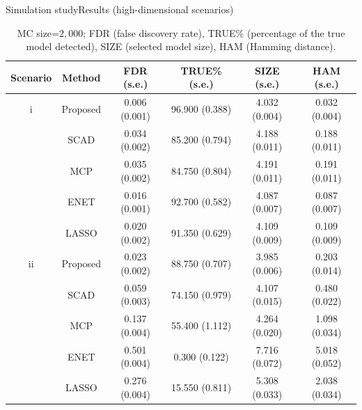 \documentclass[citecolor=blue,10pt]{beamer}
\newcommand{\0} {\mbox{\boldmath$0$}}
\begin{document}
\begin{frame}{Simulation study}{Results (high-dimensional scenarios)}
{\footnotesize
\begin{table}[H]
 \centering 
 \caption{MC size=$2,000$; FDR (false discovery rate), TRUE\% (percentage of the true model detected), SIZE (selected model size), HAM (Hamming distance).}\label{T:sim1}
 \begin{tabular}{cc|c|c|c|c}
  \hline
  Scenario & Method                         & FDR  (s.e.)    & TRUE\% (s.e.)   & SIZE (s.e.)     & HAM (s.e.)    \\
  \hline
i           & Proposed & 0.006 (0.001)  & 96.900 (0.388)  & 4.032 (0.004)    & 0.032 (0.004) \\
           & SCAD                           & 0.034 (0.002)  & 85.200 (0.794)  & 4.188 (0.011)   & 0.188 (0.011) \\
           & MCP                            & 0.035 (0.002)  & 84.750 (0.804)  & 4.191 (0.011)   & 0.191 (0.011) \\
           & ENET                           & 0.016 (0.001)  & 92.700 (0.582)  & 4.087 (0.007)   & 0.087 (0.007) \\
           & LASSO                          & 0.020 (0.002)  & 91.350 (0.629)  & 4.109 (0.009)   & 0.109 (0.009) \\
  \hline
ii           & Proposed & 0.023  (0.002) & 88.750  (0.707) & 3.985 (0.006)  & 0.203 (0.014) \\
           & SCAD                           & 0.059 (0.003)  & 74.150 (0.979)  & 4.107 (0.015)   & 0.480 (0.022) \\
           & MCP                            & 0.137 (0.004)  & 55.400 (1.112)  & 4.264 (0.020)   & 1.098 (0.034) \\
           & ENET                           & 0.501 (0.004)  & 0.300 (0.122)   & 7.716 (0.072)   & 5.018 (0.052) \\
           & LASSO                          & 0.276 (0.004)  & 15.550 (0.811)  & 5.308 (0.033)   & 2.038 (0.034) \\
  \hline
 \end{tabular}
\end{table}}
\end{frame}
\end{document}
